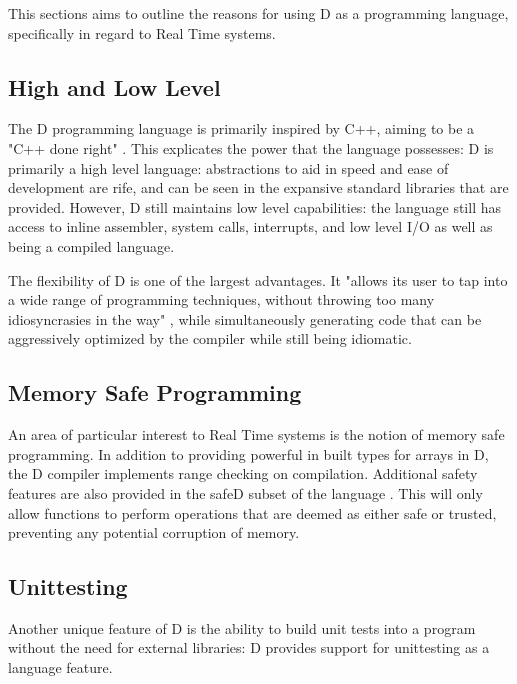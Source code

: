 This sections aims to outline the reasons for using D as a programming language,
specifically in regard to Real Time systems. 

\subsection{High and Low Level}
The D programming language is primarily inspired by C++, aiming to be a "C++ done
right" \cite{qznc.github.io/d-tut/philosophy.html}. This explicates the 
power that the language possesses: D is primarily a high level language: 
abstractions to aid in speed and ease of development are rife, and can 
be seen in the expansive standard libraries that are provided. However, D still 
maintains low level capabilities: the language still has access to inline assembler, 
system calls, interrupts, and low level I/O as well as being a compiled language. 
\par\bigskip\noindent
The flexibility of D is one of the largest advantages. It "allows its user to tap 
into a wide range of programming techniques, without throwing too many 
idiosyncrasies in the way" \cite{ddili.org/ders/d.en/Programming_in_D.pdf}, 
while simultaneously generating code that can be aggressively optimized by the
compiler while still being idiomatic\cite{dlang.org/overview.html}.

\subsection{Memory Safe Programming}
An area of particular interest to Real Time systems is the notion of memory 
safe programming. In addition to providing powerful in built types for arrays 
in D, the D compiler implements range checking on compilation. 
Additional safety features are also provided in the safeD subset of the language
\cite{dlang.org/safed.html}. This will only allow functions to perform 
operations that are deemed as either safe or trusted, preventing any 
potential corruption of memory.

\subsection{Unittesting}
Another unique feature of D is the ability to build unit tests into a 
program without the need for external libraries: D provides support for 
unittesting as a language feature. 

